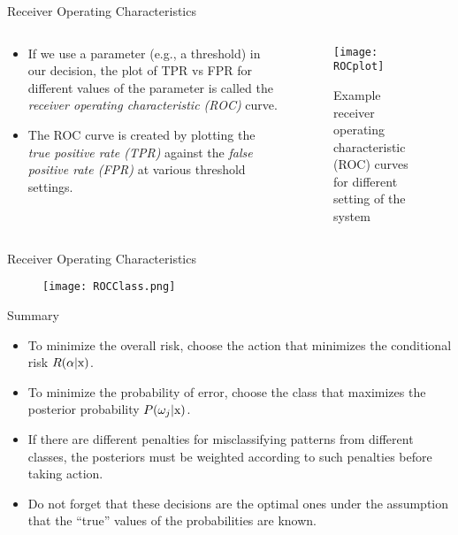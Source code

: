 \begin{frame}{Receiver Operating Characteristics}
\begin{columns}
\begin{column}{5cm}
\begin{itemize}
\item If we use a parameter (e.g.,
a threshold) in our decision, the plot of TPR vs FPR for different values of the parameter is called the
\textit{\color{mycolor2}receiver operating
characteristic (ROC)} curve.
\item The ROC curve is created by plotting the \textit{\color{mycolor2}true positive rate (TPR)} against the \textit{\color{mycolor2}false positive rate (FPR)} at various threshold settings.
\end{itemize}
\end{column}
\begin{column}{5cm}
\begin{figure}
\texttt{[image: ROCplot]}
\caption{Example receiver operating characteristic (ROC) curves for different setting of the system}
\end{figure}
\end{column}
\end{columns}
\end{frame}



\begin{frame}{Receiver Operating Characteristics}
\begin{figure}
\texttt{[image: ROCClass.png]}
\end{figure}
\end{frame}

\begin{frame}{Summary}
\begin{itemize}
\setlength{\itemsep}{6pt}
\item To minimize the overall risk, choose the action that
minimizes the conditional risk $R(\alpha|{\rm x})$.
\item To minimize the probability of error, choose the class that maximizes the posterior probability $P(\omega_j|{\rm x})$.
\item If there are different penalties for misclassifying patterns
from different classes, the posteriors must be weighted
according to such penalties before taking action.
\item Do not forget that these decisions are the optimal ones under the assumption that the ``true'' values of the
probabilities are known.
\end{itemize}
\end{frame}

